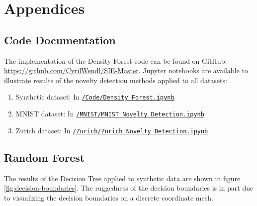 \documentclass[10pt]{article}
\begin{document}
\newpage
\printbibliography


\newpage
\renewcommand{\thesubsection}{\Alph{subsection}}
\pagebreak  

\section{Appendices}


\subsection{Code Documentation}
\label{subsec:implementation}
The implementation of the Density Forest code can be found on GitHub: \url{https://github.com/CyrilWendl/SIE-Master}. Jupyter notebooks are available to illustrate results of the novelty detection methods applied to all datasets:
\begin{enumerate}
    \item Synthetic dataset: In  \href{https://github.com/CyrilWendl/SIE-Master/blob/master/Code/Density%20Forest.ipynb}{\texttt{/Code/Density Forest.ipynb}}
    \item MNIST dataset: In \href{https://github.com/CyrilWendl/SIE-Master/blob/master/MNIST/MNIST%20Novelty%20Detection.ipynb}{\texttt{/MNIST/MNIST Novelty Detection.ipynb}}
    \item Zurich dataset: In \href{https://github.com/CyrilWendl/SIE-Master/blob/master/Zurich/Zurich%20Dataset%20Novelty%20Detection.ipynb}{\texttt{/Zurich/Zurich Novelty Detection.ipynb}}
\end{enumerate}

\subsection{Random Forest}
\label{app:rf}
The results of the Decision Tree applied to synthetic data are shown in figure \ref{fig:decision-boundaries}. The ruggedness of the decision boundaries is in part due to visualizing the decision boundaries on a discrete coordinate mesh.
\end{document}
